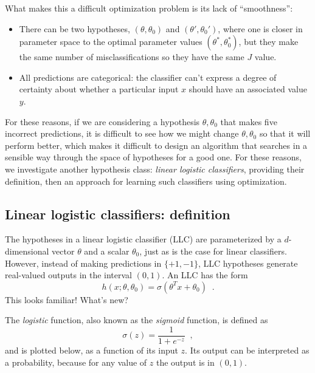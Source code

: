 What makes this a difficult optimization problem is its lack of
``smoothness'':
\begin{itemize}
  \item There can be two hypotheses, $(\theta, \theta_0)$  and
        $(\theta', \theta_0')$, where
        one is closer in parameter space to the optimal parameter values
        $(\theta^*, \theta_0^*)$, but they make the same number of
        misclassifications so they have the same $J$ value.
  \item All predictions are categorical:  the classifier can't express a
        degree of certainty about whether a particular input $x$ should have
        an associated value $y$.
\end{itemize}
For these reasons, if we are considering a hypothesis $\theta,\theta_0$
that makes five incorrect predictions, it is difficult to see how we
might change $\theta,\theta_0$ so that it will perform better, which
makes it difficult to design an algorithm that searches in a sensible
way through the
space of hypotheses for a good one.
For these reasons, we investigate another hypothesis class: {\em
linear logistic classifiers}, providing their definition, then an
approach for learning such classifiers using optimization.

\subsection{Linear logistic classifiers: definition}

The hypotheses in a linear logistic classifier (LLC) are
parameterized by a $d$-dimensional vector $\theta$ and a scalar
$\theta_0$, just as is the case for linear classifiers.  However,
instead of making predictions in $\{+1, -1\}$, LLC hypotheses
generate real-valued outputs in the interval $(0, 1)$. An LLC has the form
\[h(x; \theta, \theta_0) = \sigma(\theta^T x + \theta_0)\;\;.\]
This looks familiar!  What's new?

The {\em logistic} function, also known as the {\em sigmoid} function,
is defined as
\[\sigma(z) = \frac{1}{1+e^{-z}}\;\;,\] and is plotted below, as a
function of its input $z$.
Its output can be interpreted as a probability, because for any value of
$z$ the output is in $(0, 1)$.

\begin{center}
\end{center}

